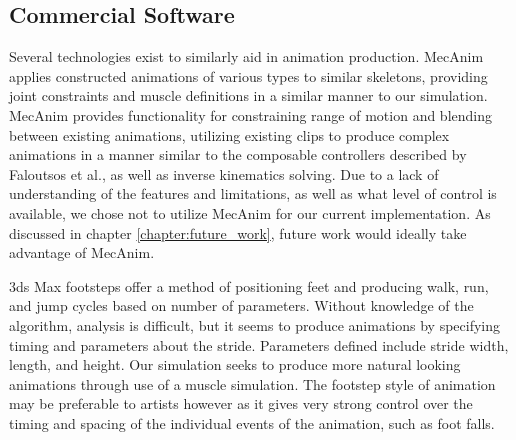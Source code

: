 \subsection{Commercial Software}
Several technologies exist to similarly aid in animation production. \unity{} MecAnim applies constructed animations of various types to similar skeletons, providing joint constraints and muscle definitions in a similar manner to our simulation.  MecAnim provides functionality for constraining range of motion and blending between existing animations, utilizing existing clips to produce complex animations in a manner similar to the composable controllers described by Faloutsos et al., as well as inverse kinematics solving.  Due to a lack of understanding of the features and limitations, as well as what level of control is available, we chose not to utilize MecAnim for our current implementation.  As discussed in chapter \ref{chapter:future_work}, future work would ideally take advantage of MecAnim.

3ds Max footsteps offer a method of positioning feet and producing walk, run, and jump cycles based on  number of parameters.  Without knowledge of the algorithm, analysis is difficult, but it seems to produce animations by specifying timing and parameters about the stride.  Parameters defined include stride width, length, and height.  Our simulation seeks to produce more natural looking animations through use of a muscle simulation.  The footstep style of animation may be preferable to artists however as it gives very strong control over the timing and spacing of the individual events of the animation, such as foot falls.